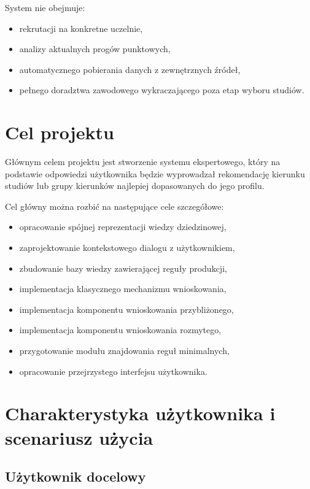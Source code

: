 \documentclass[12pt,a4paper,oneside]{article}
\begin{document}
System nie obejmuje:
\begin{itemize}[leftmargin=1.2cm]
    \item rekrutacji na konkretne uczelnie,
    \item analizy aktualnych progów punktowych,
    \item automatycznego pobierania danych z zewnętrznych źródeł,
    \item pełnego doradztwa zawodowego wykraczającego poza etap wyboru studiów.
\end{itemize}

\section{Cel projektu}

Głównym celem projektu jest stworzenie systemu ekspertowego, który na podstawie odpowiedzi użytkownika będzie wyprowadzał rekomendację kierunku studiów lub grupy kierunków najlepiej dopasowanych do jego profilu.

Cel główny można rozbić na następujące cele szczegółowe:
\begin{itemize}[leftmargin=1.2cm]
    \item opracowanie spójnej reprezentacji wiedzy dziedzinowej,
    \item zaprojektowanie kontekstowego dialogu z użytkownikiem,
    \item zbudowanie bazy wiedzy zawierającej reguły produkcji,
    \item implementacja klasycznego mechanizmu wnioskowania,
    \item implementacja komponentu wnioskowania przybliżonego,
    \item implementacja komponentu wnioskowania rozmytego,
    \item przygotowanie modułu znajdowania reguł minimalnych,
    \item opracowanie przejrzystego interfejsu użytkownika.
\end{itemize}

\newpage
\section{Charakterystyka użytkownika i scenariusz użycia}

\subsection{Użytkownik docelowy}
\end{document}
